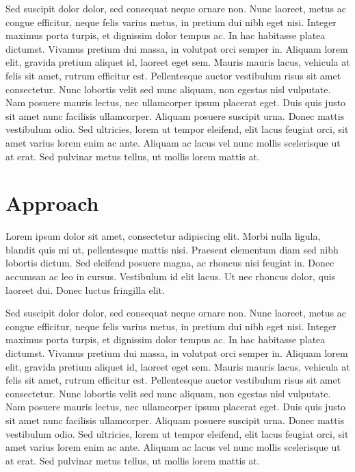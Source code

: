 \documentclass[a4paper, 11pt]{article}
\begin{document}
Sed suscipit dolor dolor, sed consequat neque ornare non. Nunc laoreet, metus ac congue efficitur, neque felis varius metus, in pretium dui nibh eget nisi. Integer maximus porta turpis, et dignissim dolor tempus ac. In hac habitasse platea dictumst. Vivamus pretium dui massa, in volutpat orci semper in. Aliquam lorem elit, gravida pretium aliquet id, laoreet eget sem. Mauris mauris lacus, vehicula at felis sit amet, rutrum efficitur est. Pellentesque auctor vestibulum risus sit amet consectetur. Nunc lobortis velit sed nunc aliquam, non egestas nisl vulputate. Nam posuere mauris lectus, nec ullamcorper ipsum placerat eget. Duis quis justo sit amet nunc facilisis ullamcorper. Aliquam posuere suscipit urna. Donec mattis vestibulum odio. Sed ultricies, lorem ut tempor eleifend, elit lacus feugiat orci, sit amet varius lorem enim ac ante. Aliquam ac lacus vel nunc mollis scelerisque ut at erat. Sed pulvinar metus tellus, ut mollis lorem mattis at.


\section{Approach}
Lorem ipsum dolor sit amet, consectetur adipiscing elit. Morbi nulla ligula, blandit quis mi ut, pellentesque mattis nisi. Praesent elementum diam sed nibh lobortis dictum. Sed eleifend posuere magna, ac rhoncus nisi feugiat in. Donec accumsan ac leo in cursus. Vestibulum id elit lacus. Ut nec rhoncus dolor, quis laoreet dui. Donec luctus fringilla elit.

Sed suscipit dolor dolor, sed consequat neque ornare non. Nunc laoreet, metus ac congue efficitur, neque felis varius metus, in pretium dui nibh eget nisi. Integer maximus porta turpis, et dignissim dolor tempus ac. In hac habitasse platea dictumst. Vivamus pretium dui massa, in volutpat orci semper in. Aliquam lorem elit, gravida pretium aliquet id, laoreet eget sem. Mauris mauris lacus, vehicula at felis sit amet, rutrum efficitur est. Pellentesque auctor vestibulum risus sit amet consectetur. Nunc lobortis velit sed nunc aliquam, non egestas nisl vulputate. Nam posuere mauris lectus, nec ullamcorper ipsum placerat eget. Duis quis justo sit amet nunc facilisis ullamcorper. Aliquam posuere suscipit urna. Donec mattis vestibulum odio. Sed ultricies, lorem ut tempor eleifend, elit lacus feugiat orci, sit amet varius lorem enim ac ante. Aliquam ac lacus vel nunc mollis scelerisque ut at erat. Sed pulvinar metus tellus, ut mollis lorem mattis at.
\end{document}

